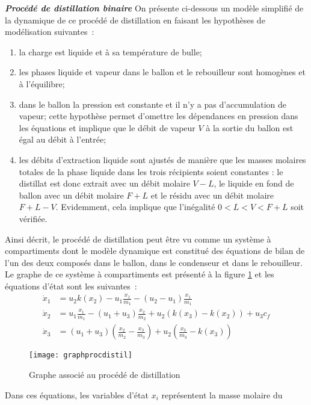 \begin{exemple}{\bf \em Procédé de distillation binaire}
On présente ci-dessous un modèle simplifié de la dynamique de ce procédé de distillation en faisant les
hypothèses de modélisation suivantes~:
\begin{enumerate}
\item la charge est liquide et à sa température de bulle;
\item les phases liquide et vapeur dans le ballon et le rebouilleur sont homogènes et à
l'équilibre;
\item dans le ballon la pression est constante et il n'y a pas d'accumulation de vapeur; cette hypothèse permet d'omettre les dépendances en pression dans les équations et implique que le débit de vapeur $V$  à la sortie du ballon est égal au débit à l'entrée; 
\item les débits d'extraction liquide sont ajustés de manière que les masses molaires totales de la phase liquide dans les trois récipients soient constantes : le distillat est donc extrait avec un débit molaire $V-L$, le liquide en fond de ballon avec un débit molaire $F+L$ et le résidu avec un débit molaire $F+L-V$. Evidemment, cela implique que l'inégalité $0 < L < V < F+L$ soit vérifiée.\\
\end{enumerate}
Ainsi décrit, le procédé de distillation peut être vu comme un système à
compartiments dont le modèle dynamique est constitué des
équations de bilan de l'un des deux composés dans le ballon, dans le condenseur et dans le rebouilleur. Le graphe de ce système à
compartiments est présenté à la figure \ref{Fig:graphdisti} et les équations
d'état sont les suivantes~:
\begin{equation*} \begin{split}
\dot x_1 &= u_2 k(x_2) - u_{1}\frac{x_1}{m_1} - (u_2 - u_1) \frac{x_1}{m_1}\\
\dot x_2 &= u_1\frac{x_1}{m_1} - (u_1+u_3)\frac{x_2}{m_2} + u_2(k(x_3) - k(x_2)) + u_3c_f\\
\dot x_3 &= (u_1 + u_3)(\frac{x_2}{m_2} - \frac{x_3}{m_3}) + u_2(\frac{x_3}{m_3} - k(x_3))
\end{split} \end{equation*}
\begin{figure}[h]
\begin{center}
\texttt{[image: graphprocdistil]}
\caption{Graphe associé au procédé de distillation}
\label{Fig:graphdisti}
\end{center} 
\end{figure}
Dans ces équations, les variables d'état $x_i$ représentent la masse molaire du

\end{exemple}
